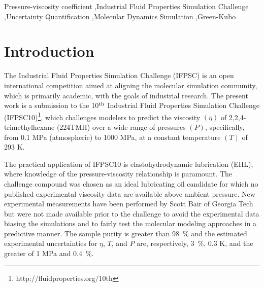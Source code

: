 \documentclass[preprint,review,12pt]{elsarticle}
\begin{document}
\begin{frontmatter}
\begin{abstract}
			
		\end{abstract}
		
		\begin{keyword}
			
			
			
			Pressure-viscosity coefficient \sep Industrial Fluid Properties Simulation Challenge \sep Uncertainty Quantification \sep Molecular Dynamics Simulation \sep Green-Kubo
			
		\end{keyword}
		
	\end{frontmatter}	
		
	\section{Introduction}
	
	The Industrial Fluid Properties Simulation Challenge (IFPSC) is an open international competition aimed at aligning the molecular simulation community, which is primarily academic, with the goals of industrial research. The present work is a submission to the 10$^{\rm th}$ Industrial Fluid Properties Simulation Challenge (IFPSC10)\footnote{http://fluidproperties.org/10th}, which challenges modelers to predict the viscosity $(\eta)$ of 2,2,4-trimethylhexane (224TMH) over a wide range of pressures $(P)$, specifically, from 0.1 MPa (atmospheric) to 1000 MPa, at a constant temperature $(T)$ of 293 K.
	
    The practical application of IFPSC10 is elastohydrodynamic lubrication (EHL), where knowledge of the pressure-viscosity relationship is paramount. The challenge compound was chosen as an ideal lubricating oil candidate for which no published experimental viscosity data are available above ambient pressure. New experimental measurements have been performed by Scott Bair of Georgia Tech but were not made available prior to the challenge to avoid the experimental data biasing the simulations and to fairly test the molecular modeling approaches in a predictive manner. The sample purity is greater than 98~\% and the estimated experimental uncertainties for $\eta$, $T$, and $P$ are, respectively, 3~\%, 0.3 K, and the greater of 1 MPa and 0.4~\%.
	
\end{document}
